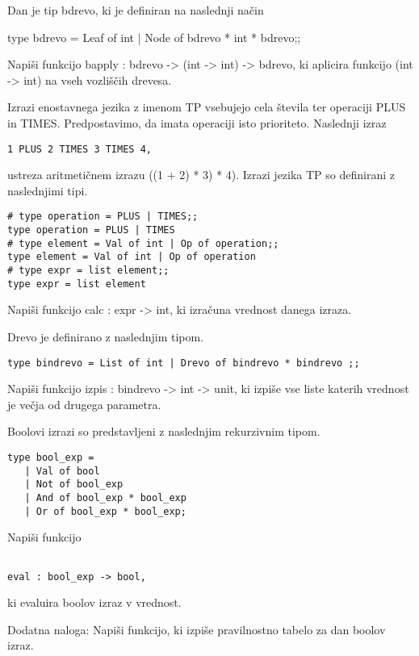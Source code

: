 \begin{ex}
Dan je tip bdrevo, ki je definiran na naslednji na\v cin

type bdrevo = Leaf of int | Node of bdrevo * int * bdrevo;;

Napi\v si funkcijo bapply : bdrevo -> (int -> int) -> bdrevo, ki aplicira funkcijo (int -> int) na vseh vozli\v s\v cih drevesa.  


\end{ex} 
\begin{ex}
Izrazi enostavnega jezika z imenom TP vsebujejo cela \v stevila ter operaciji PLUS in TIMES. Predpostavimo, da imata operaciji isto prioriteto. Naslednji izraz
\begin{lstlisting}
1 PLUS 2 TIMES 3 TIMES 4,
\end{lstlisting}
ustreza aritmeti\v cnem izrazu ((1 + 2) * 3) * 4). Izrazi jezika TP so definirani z naslednjimi tipi. 
 
\begin{lstlisting}
# type operation = PLUS | TIMES;; 
type operation = PLUS | TIMES 
# type element = Val of int | Op of operation;; 
type element = Val of int | Op of operation
# type expr = list element;;
type expr = list element

\end{lstlisting}
Napi\v si funkcijo calc : expr -> int, ki izra\v cuna vrednost danega izraza.  


\end{ex} 
\begin{ex}
Drevo je definirano z naslednjim tipom. 

\begin{lstlisting}
type bindrevo = List of int | Drevo of bindrevo * bindrevo ;; 
\end{lstlisting}

Napi\v si funkcijo izpis : bindrevo -> int -> unit, ki izpi\v se vse liste katerih vrednost je ve\v cja od drugega parametra. 


\end{ex} 
\begin{ex}
Boolovi izrazi so predstavljeni z naslednjim rekurzivnim tipom.   

\begin{lstlisting}
type bool_exp =
   | Val of bool
   | Not of bool_exp
   | And of bool_exp * bool_exp
   | Or of bool_exp * bool_exp;

\end{lstlisting}
Napi\v si funkcijo
\begin{lstlisting}

eval : bool_exp -> bool, 
\end{lstlisting}

ki evaluira boolov izraz v vrednost.   

Dodatna naloga: Napi\v si funkcijo, ki izpi\v se pravilnostno tabelo
za dan boolov izraz.


\end{ex} 
